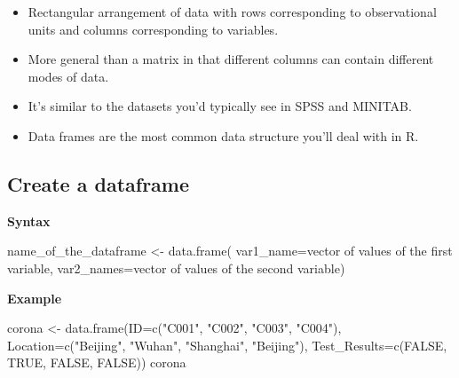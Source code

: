 \documentclass[
  letterpaper,
  DIV=11,
  numbers=noendperiod]{scrreprt}
\newenvironment{Shaded}{\begin{snugshade}}{\end{snugshade}}
\newcommand{\AttributeTok}[1]{\textcolor[rgb]{0.40,0.45,0.13}{#1}}
\newcommand{\ConstantTok}[1]{\textcolor[rgb]{0.56,0.35,0.01}{#1}}
\newcommand{\FunctionTok}[1]{\textcolor[rgb]{0.28,0.35,0.67}{#1}}
\newcommand{\NormalTok}[1]{\textcolor[rgb]{0.00,0.23,0.31}{#1}}
\newcommand{\OtherTok}[1]{\textcolor[rgb]{0.00,0.23,0.31}{#1}}
\newcommand{\StringTok}[1]{\textcolor[rgb]{0.13,0.47,0.30}{#1}}
\begin{document}
\begin{itemize}
\item
  Rectangular arrangement of data with rows corresponding to
  observational units and columns corresponding to variables.
\item
  More general than a matrix in that different columns can contain
  different modes of data.
\item
  It's similar to the datasets you'd typically see in SPSS and MINITAB.
\item
  Data frames are the most common data structure you'll deal with in R.
\end{itemize}

\subsection{Create a dataframe}\label{create-a-dataframe}

\textbf{Syntax}

\begin{Shaded}
\begin{Highlighting}[]
\NormalTok{name\_of\_the\_dataframe }\OtherTok{\textless{}{-}} \FunctionTok{data.frame}\NormalTok{(}
                          \AttributeTok{var1\_name=}\NormalTok{vector of values of the first variable,}
                          \AttributeTok{var2\_names=}\NormalTok{vector of values of the second variable)}
\end{Highlighting}
\end{Shaded}

\textbf{Example}

\begin{Shaded}
\begin{Highlighting}[]
\NormalTok{corona }\OtherTok{\textless{}{-}} \FunctionTok{data.frame}\NormalTok{(}\AttributeTok{ID=}\FunctionTok{c}\NormalTok{(}\StringTok{"C001"}\NormalTok{, }\StringTok{"C002"}\NormalTok{, }\StringTok{"C003"}\NormalTok{, }\StringTok{"C004"}\NormalTok{),}
                     \AttributeTok{Location=}\FunctionTok{c}\NormalTok{(}\StringTok{"Beijing"}\NormalTok{, }\StringTok{"Wuhan"}\NormalTok{, }\StringTok{"Shanghai"}\NormalTok{, }\StringTok{"Beijing"}\NormalTok{),}
                     \AttributeTok{Test\_Results=}\FunctionTok{c}\NormalTok{(}\ConstantTok{FALSE}\NormalTok{, }\ConstantTok{TRUE}\NormalTok{, }\ConstantTok{FALSE}\NormalTok{, }\ConstantTok{FALSE}\NormalTok{))}
\NormalTok{corona}
\end{Highlighting}
\end{Shaded}
\end{document}

